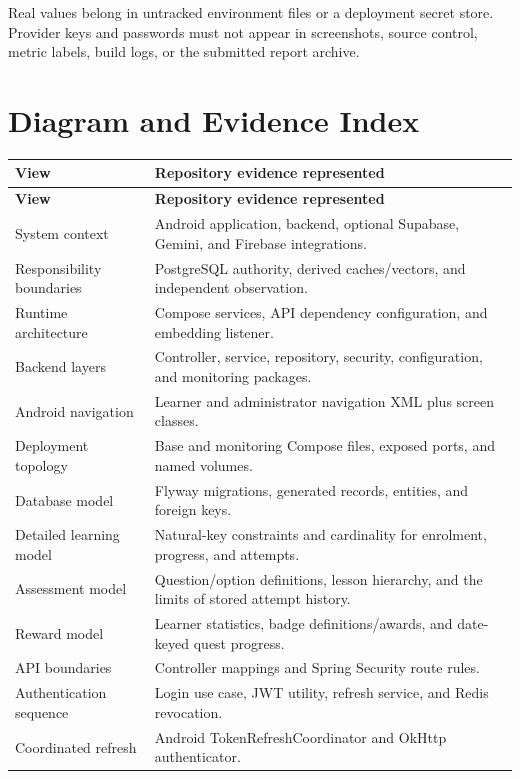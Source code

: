 \documentclass[12pt,a4paper,oneside]{report}
\begin{document}
\normalsize

Real values belong in untracked environment files or a deployment secret store.
Provider keys and passwords must not appear in screenshots, source control, metric
labels, build logs, or the submitted report archive.

\chapter{Diagram and Evidence Index}
\begin{longtable}{P{0.31\textwidth}P{0.57\textwidth}}
\toprule
\textbf{View} & \textbf{Repository evidence represented}\\\midrule\endfirsthead
\toprule\textbf{View} & \textbf{Repository evidence represented}\\\midrule\endhead
System context & Android application, backend, optional Supabase, Gemini, and Firebase integrations.\\
Responsibility boundaries & PostgreSQL authority, derived caches/vectors, and independent observation.\\
Runtime architecture & Compose services, API dependency configuration, and embedding listener.\\
Backend layers & Controller, service, repository, security, configuration, and monitoring packages.\\
Android navigation & Learner and administrator navigation XML plus screen classes.\\
Deployment topology & Base and monitoring Compose files, exposed ports, and named volumes.\\
Database model & Flyway migrations, generated records, entities, and foreign keys.\\
Detailed learning model & Natural-key constraints and cardinality for enrolment, progress, and attempts.\\
Assessment model & Question/option definitions, lesson hierarchy, and the limits of stored attempt history.\\
Reward model & Learner statistics, badge definitions/awards, and date-keyed quest progress.\\
API boundaries & Controller mappings and Spring Security route rules.\\
Authentication sequence & Login use case, JWT utility, refresh service, and Redis revocation.\\
Coordinated refresh & Android TokenRefreshCoordinator and OkHttp authenticator.\\

\end{longtable}
\end{document}
